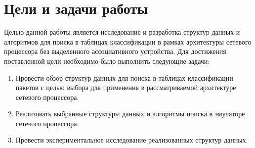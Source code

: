 \documentclass[a4peper, 12pt, titlepage, finall]{report}
\begin{document}
    \chapter{Цели и задачи работы}
        Целью данной работы является исследование и разработка структур данных и алгоритмов для поиска в таблицах классификации 
        в рамках архитектуры сетевого процессора без выделенного ассоциативного устройства.
        Для достижения поставленной цели необходимо было выполнить следующие задачи:
        \begin{enumerate}
            \item Провести обзор структур данных для поиска в таблицах классификации пакетов с целью выбора для применения в рассматриваемой архитектуре сетевого процессора.
            \item Реализовать выбранные структуры данных и алгоритмы поиска в эмуляторе сетевого процессора.
            \item Провести экспериментальное исследование реализованных структур данных.
        \end{enumerate}
       
\end{document}
